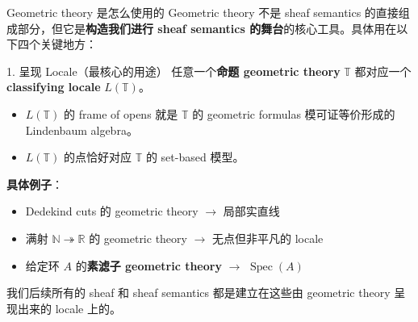 \documentclass{beamer}
\begin{document}
\begin{frame}{Geometric theory 是怎么使用的}
Geometric theory 不是 sheaf semantics 的直接组成部分，但它是\textbf{构造我们进行 sheaf semantics 的舞台}的核心工具。具体用在以下四个关键地方：
\end{frame}

\begin{frame}{1. 呈现 Locale（最核心的用途）}
任意一个\textbf{命题 geometric theory} $\mathbb{T}$ 都对应一个 \textbf{classifying locale} $L(\mathbb{T})$。

\begin{itemize}
    \item $L(\mathbb{T})$ 的 frame of opens 就是 $\mathbb{T}$ 的 geometric formulas 模可证等价形成的 Lindenbaum algebra。
    \item $L(\mathbb{T})$ 的点恰好对应 $\mathbb{T}$ 的 set-based 模型。
\end{itemize}

\textbf{具体例子}：
\begin{itemize}
    \item Dedekind cuts 的 geometric theory $\to$ 局部实直线
    \item 满射 $\mathbb{N}\twoheadrightarrow\mathbb{R}$ 的 geometric theory $\to$ 无点但非平凡的 locale
    \item 给定环 $A$ 的\textbf{素滤子 geometric theory} $\to$ $\operatorname{Spec}(A)$
\end{itemize}

我们后续所有的 sheaf 和 sheaf semantics 都是建立在这些由 geometric theory 呈现出来的 locale 上的。
\end{frame}
\end{document}
